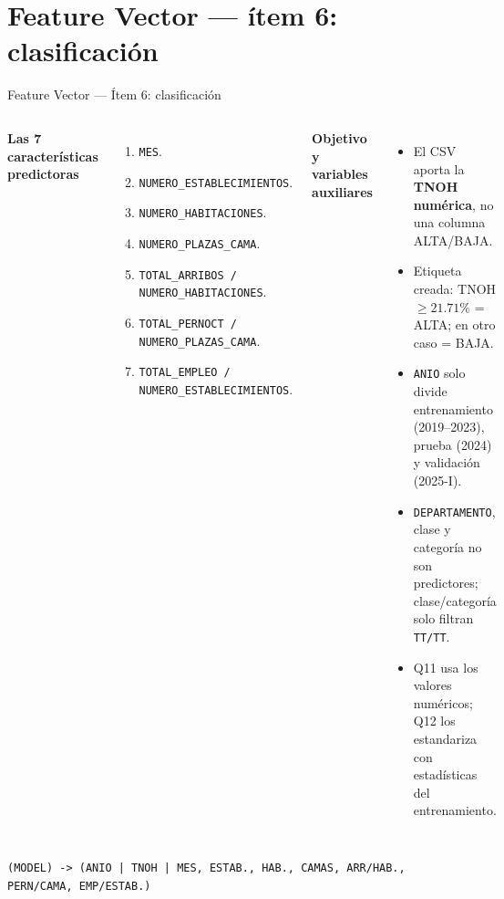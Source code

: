 \documentclass{beamer}
\begin{document}
\section{Feature Vector — ítem 6: clasificación}

\begin{frame}{Feature Vector — Ítem 6: clasificación}
\scriptsize
\begin{columns}[T,onlytextwidth]
\textbf{Las 7 características predictoras}
\begin{enumerate}\setlength\itemsep{1pt}
  \item \texttt{MES}.
  \item \texttt{NUMERO\_ESTABLECIMIENTOS}.
  \item \texttt{NUMERO\_HABITACIONES}.
  \item \texttt{NUMERO\_PLAZAS\_CAMA}.
  \item \texttt{TOTAL\_ARRIBOS / NUMERO\_HABITACIONES}.
  \item \texttt{TOTAL\_PERNOCT / NUMERO\_PLAZAS\_CAMA}.
  \item \texttt{TOTAL\_EMPLEO / NUMERO\_ESTABLECIMIENTOS}.
\end{enumerate}

\textbf{Objetivo y variables auxiliares}
\begin{itemize}\setlength\itemsep{2pt}
  \item El CSV aporta la \textbf{TNOH numérica}, no una columna ALTA/BAJA.
  \item Etiqueta creada: TNOH $\ge 21.71\%$ = ALTA; en otro caso = BAJA.
  \item \texttt{ANIO} solo divide entrenamiento (2019--2023), prueba (2024) y validación (2025-I).
  \item \texttt{DEPARTAMENTO}, clase y categoría no son predictores; clase/categoría solo filtran \texttt{TT/TT}.
  \item Q11 usa los valores numéricos; Q12 los estandariza con estadísticas del entrenamiento.
\end{itemize}
\end{columns}

\centering
\texttt{(MODEL) -> (ANIO | TNOH | MES, ESTAB., HAB., CAMAS, ARR/HAB., PERN/CAMA, EMP/ESTAB.)}
\end{frame}
\end{document}
